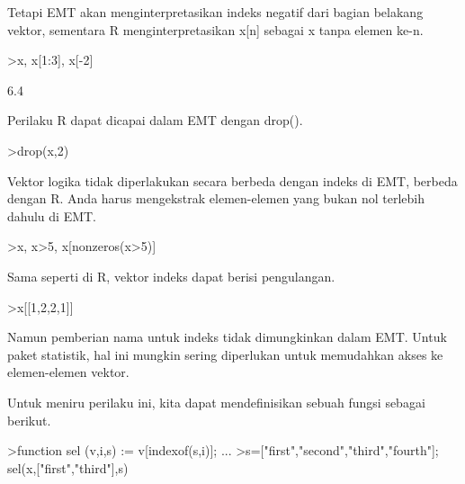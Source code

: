 \documentclass{article}
\begin{document}
\begin{eulernotebook}
\begin{eulercomment}
Tetapi EMT akan menginterpretasikan indeks negatif dari bagian
belakang vektor, sementara R menginterpretasikan x[n] sebagai x tanpa
elemen ke-n.
\end{eulercomment}
\begin{eulerprompt}
>x, x[1:3], x[-2]
\end{eulerprompt}
\begin{euleroutput}
  [10.4,  5.6,  3.1,  6.4,  21.7]
  [10.4,  5.6,  3.1]
  6.4
\end{euleroutput}
\begin{eulercomment}
Perilaku R dapat dicapai dalam EMT dengan drop().
\end{eulercomment}
\begin{eulerprompt}
>drop(x,2)
\end{eulerprompt}
\begin{euleroutput}
  [10.4,  3.1,  6.4,  21.7]
\end{euleroutput}
\begin{eulercomment}
Vektor logika tidak diperlakukan secara berbeda dengan indeks di EMT,
berbeda dengan R. Anda harus mengekstrak elemen-elemen yang bukan nol
terlebih dahulu di EMT.
\end{eulercomment}
\begin{eulerprompt}
>x, x>5, x[nonzeros(x>5)]
\end{eulerprompt}
\begin{euleroutput}
  [10.4,  5.6,  3.1,  6.4,  21.7]
  [1,  1,  0,  1,  1]
  [10.4,  5.6,  6.4,  21.7]
\end{euleroutput}
\begin{eulercomment}
Sama seperti di R, vektor indeks dapat berisi pengulangan.
\end{eulercomment}
\begin{eulerprompt}
>x[[1,2,2,1]]
\end{eulerprompt}
\begin{euleroutput}
  [10.4,  5.6,  5.6,  10.4]
\end{euleroutput}
\begin{eulercomment}
Namun pemberian nama untuk indeks tidak dimungkinkan dalam EMT. Untuk
paket statistik, hal ini mungkin sering diperlukan untuk memudahkan
akses ke elemen-elemen vektor.

Untuk meniru perilaku ini, kita dapat mendefinisikan sebuah fungsi
sebagai berikut.
\end{eulercomment}
\begin{eulerprompt}
>function sel (v,i,s) := v[indexof(s,i)]; ...
>s=["first","second","third","fourth"]; sel(x,["first","third"],s)
\end{eulerprompt}
\begin{euleroutput}
  

\end{euleroutput}
\end{eulernotebook}
\end{document}
